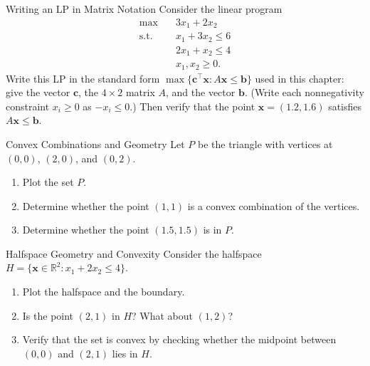 \begin{ex}{Writing an LP in Matrix Notation}{}
\label{ex:lp-matrix-notation}
Consider the linear program
\begin{align*}
\max \quad & 3x_1 + 2x_2\\
\text{s.t.} \quad & x_1 + 3x_2 \leq 6\\
& 2x_1 + x_2 \leq 4\\
& x_1, x_2 \geq 0.
\end{align*}
Write this LP in the standard form \( \max\{ \mathbf{c}^\top \mathbf{x} : A\mathbf{x} \leq \mathbf{b} \} \) used in this chapter: give the vector \( \mathbf{c} \), the \( 4 \times 2 \) matrix \( A \), and the vector \( \mathbf{b} \). (Write each nonnegativity constraint \( x_i \geq 0 \) as \( -x_i \leq 0 \).) Then verify that the point \( \mathbf{x} = (1.2, 1.6) \) satisfies \( A\mathbf{x} \leq \mathbf{b} \).
\exrefs{\S\ref{sec:math-preliminaries}, \S\ref{sec:algebraic-vertex-proof}}
\end{ex}


\begin{ex}{Convex Combinations and Geometry}{}
\label{ex:convex-combo-triangle}
Let \( P \) be the triangle with vertices at \( (0,0) \), \( (2,0) \), and \( (0,2) \).
\begin{enumerate}
    \item Plot the set \( P \).
    \item Determine whether the point \( (1,1) \) is a convex combination of the vertices.
    \item Determine whether the point \( (1.5,1.5) \) is in \( P \).
\end{enumerate}
\exrefs{\S\ref{sec:convexity}}
\end{ex}

\begin{ex}{Halfspace Geometry and Convexity}{}
Consider the halfspace \( H = \{ \mathbf{x} \in \mathbb{R}^2 : x_1 + 2x_2 \leq 4 \} \).
\begin{enumerate}
    \item Plot the halfspace and the boundary.
    \item Is the point \( (2,1) \) in \( H \)? What about \( (1,2) \)?
    \item Verify that the set is convex by checking whether the midpoint between \( (0,0) \) and \( (2,1) \) lies in \( H \).
\end{enumerate}
\end{ex}

